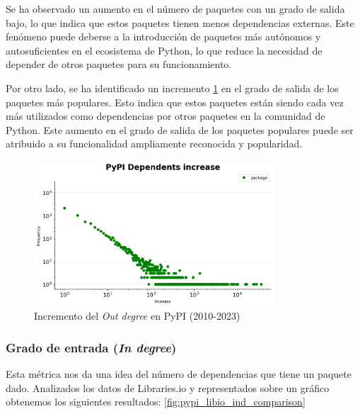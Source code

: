 Se ha observado un aumento en el número de paquetes con un grado de salida bajo, lo que indica que estos
paquetes tienen menos dependencias externas. Este fenómeno puede deberse a la introducción de paquetes
más autónomos y autosuficientes en el ecosistema de Python, lo que reduce la necesidad de depender de
otros paquetes para su funcionamiento.

Por otro lado, se ha identificado un incremento \ref{fig:dependents_increase} en el grado de salida de los paquetes más populares.
Esto indica que estos paquetes están siendo cada vez más utilizados como dependencias por otros paquetes
en la comunidad de Python. Este aumento en el grado de salida de los paquetes populares puede ser atribuido
a su funcionalidad ampliamente reconocida y popularidad.

\begin{figure}[ht!]
    \begin{center}
        \includegraphics[width=0.8\textwidth]{img/pypi/dependents_increase.png}
        \caption{Incremento del \textit{Out degree} en PyPI (2010-2023)}
        \label{fig:dependents_increase}
    \end{center}
\end{figure}


\subsubsection{Grado de entrada (\textit{In degree})}

Esta métrica nos da una idea del número de dependencias que tiene un paquete dado.
Analizados los datos de Libraries.io y representados sobre un gráfico obtenemos los siguientes resultados: \ref{fig:pypi_libio_ind_comparison}

